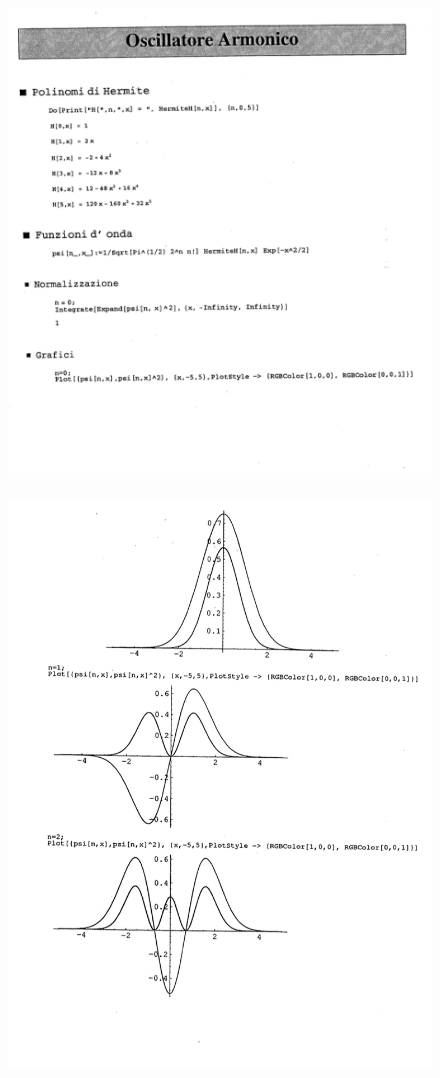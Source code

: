 \documentclass[a4paper,12pt,oneside]{book}
\begin{document}
\newpage
\begin{figure}[htbp]
\begin{center}
\includegraphics[width=\textwidth]{immagini/cap_11/polHer1.png}
\end{center}
\end{figure}

\begin{figure}[htbp]
\begin{center}
\includegraphics[width=\textwidth]{immagini/cap_11/polHer2.png}
\end{center}
\end{figure}
\end{document}
